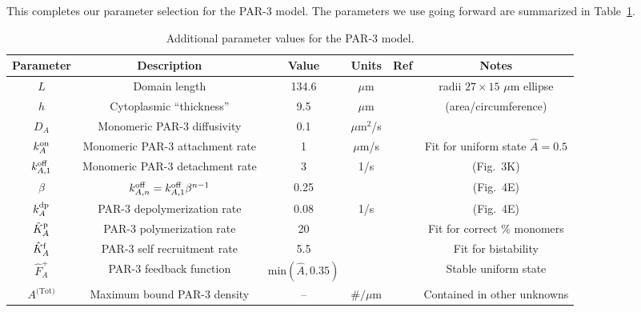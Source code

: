 \documentclass[11pt]{article}
\newcommand{\6}[1]{#1_{\text{6}}}
\newcommand{\3}[1]{#1_{\text{3}}}
\newcommand{\Tot}[1]{#1^\text{(Tot)}}
\newcommand{\A}[1]{#1_A}
\begin{document}
This completes our parameter selection for the PAR-3 model. The parameters we use going forward are summarized in Table\ \ref{tab:paramsP3}.


\begin{table}
\begin{small}
\centering
\begin{tabular}{|c|c|c|c|c|c|}\hline
Parameter & Description & Value & Units & Ref & Notes \\ \hline
$L$ & Domain length & 134.6 & $\mu$m &  \cite{goehring2011polarization} & radii $27 \times 15$ $\mu$m ellipse\\
$h$ & Cytoplasmic ``thickness'' & 9.5 & $\mu$m &  \cite{goehring2011polarization}  &  (area/circumference)\\ \hline
$\A{D} $ & Monomeric PAR-3 diffusivity & 0.1 & $\mu$m$^2$/s & \cite{lang2023oligomerization} & \\
$\A{\kon}$ & Monomeric PAR-3 attachment rate & 1& $\mu$m/s & & Fit for uniform state $\hat A=0.5$ \\
$k^\text{off}_{A,1}$ & Monomeric PAR-3 detachment rate &  3& 1/s & \cite{lang2023oligomerization} & (Fig.\ 3K)\\
$\beta$ & $k^\text{off}_{A,n}=k^\text{off}_{A,1}\beta^{n-1}$ & 0.25 & & \cite{lang2023oligomerization} & (Fig.\ 4E) \\
$\A{\kdp}$ & PAR-3 depolymerization rate & 0.08 & 1/s & \cite{lang2023oligomerization} & (Fig.\ 4E) \\
$\hat{K}^\text{p}_A$ & PAR-3 polymerization rate & 20 & & & Fit for correct \% monomers \cite{lang2023oligomerization}  \\
$\hat{K}^\text{f}_A$ & PAR-3 self recruitment rate &5.5 & & & Fit for bistability\\
$\hat F_A^+$ & PAR-3 feedback function &$\text{min}\left(\hat A,0.35\right)$ &  &\cite{lang2022oligomerization} &  Stable uniform state\\
$\Tot{A}$ & Maximum bound PAR-3 density & -- & $\#/\mu$m & & Contained in other unknowns \\ \hline
\end{tabular}
\caption{\label{tab:paramsP3}Additional parameter values for the PAR-3 model. }
\end{small}
\end{table}
\end{document}
